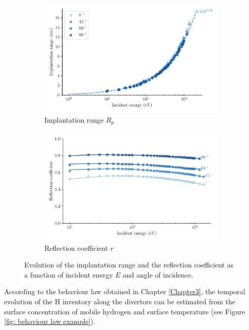 \begin{figure}[h]
    \centering
    \begin{subfigure}{0.5\linewidth}
        \includegraphics[width=\linewidth]{Figures/Chapter4/implantation_range.pdf}
        \caption{Implantation range $R_p$}
        \label{fig: implantation range vs energy}
    \end{subfigure}%
    \begin{subfigure}{0.5\linewidth}                          
        \includegraphics[width=\linewidth]{Figures/Chapter4/reflection_coeff.pdf}
        \caption{Reflection coefficient $r$}
        \label{fig: reflection coeff vs energy}
    \end{subfigure}
    \caption{Evolution of the implantation range and the reflection coefficient as a function of incident energy $E$ and angle of incidence.}
\end{figure}

According to the behaviour law obtained in Chapter \ref{Chapter3}, the temporal evolution of the H inventory along the divertors can be estimated from the surface concentration of mobile hydrogen and surface temperature (see Figure \ref{fig: behaviour law example}).

